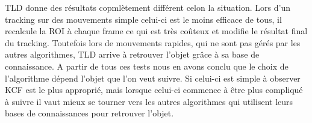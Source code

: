 TLD donne des résultats copmlètement différent celon la situation. Lors d'un tracking sur des mouvements simple celui-ci est le moins efficace de tous, il recalcule la ROI à chaque frame ce qui est très coûteux et modifie le résultat final du tracking. Toutefois lors de mouvements rapides, qui ne sont pas gérés par les autres algorithmes, TLD arrive à retrouver  l'objet grâce à sa base de connaissance.
A partir de tous ces tests nous en avons conclu que le choix de l'algorithme dépend l'objet que l'on veut suivre. Si celui-ci est simple à observer KCF est le plus approprié, mais lorsque celui-ci commence à être plus compliqué à suivre il vaut mieux se tourner vers les autres algorithmes qui utilisent leurs bases de connaissances pour retrouver l'objet.
